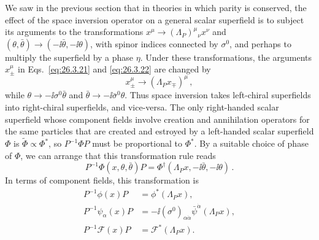We saw in the previous section that in theories in which parity is conserved,
the effect of the space inversion operator on a general scalar superfield is
to subject its arguments to the transformations
$x^\mu\rightarrow(\Lambda_P)^\mu{}_\nu x^\nu$ and
\((\theta,\bar\theta)\rightarrow(-\ii\bar\theta,-\ii\theta)\), with spinor
indices connected by \(\sigma^0\), and perhaps to multiply the superfield by
a phase \(\eta\). Under these transformations, the arguments \(x_\pm^\mu\) in
Eqs.~\eqref{eq:26.3.21} and \eqref{eq:26.3.22} are changed by
\begin{equation}
  x_\pm^\mu\longrightarrow
  (\Lambda_Px_\mp)^\mu\,,
  \tag{26.3.34}\label{eq:26.3.34}
\end{equation}
while \(\theta\rightarrow-\ii\sigma^0\bar\theta\) and
\(\bar\theta\rightarrow-\ii\bar\sigma^0\theta\). Thus space inversion takes left-chiral
superfields into right-chiral superfields, and vice-versa. The only
right-handed scalar superfield whose component fields involve creation and
annihilation operators for the same particles that are created and \dd estroyed
by a left-handed scalar superfield $\Phi$ is
$\widetilde{\Phi}\mathrel{\propto}\Phi^*$, so $P^{-1}\Phi P$ must be
proportional to $\Phi^*$. By a suitable choice of phase of $\Phi$, we can
arrange that this transformation rule reads
\begin{equation}
  P^{-1}\Phi(x,\theta,\bar\theta)P
  =\Phi^\dagger(\Lambda_Px,-\ii\bar\theta,-\ii\theta)\,.
  \tag{26.3.35}\label{eq:26.3.35}
\end{equation}
In terms of component fields, this transformation is
\begin{equation}
  \begin{aligned}
  P^{-1}\phi(x)P&=\phi^*(\Lambda_Px),\\
  P^{-1}\psi_\alpha(x)P
    &=-\ii(\sigma^0)_{\alpha\dot\alpha}
      \bar\psi^{\dot\alpha}(\Lambda_Px),\\
  P^{-1}\mathcal{F}(x)P&=\mathcal{F}^*(\Lambda_Px).
  \end{aligned}
  \tag{26.3.36}\label{eq:26.3.36}
\end{equation}

